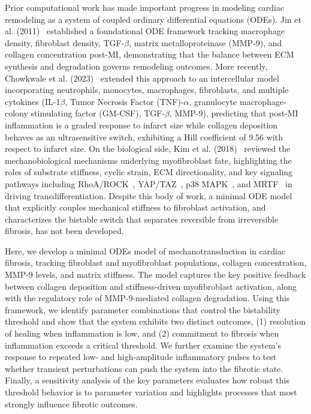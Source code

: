 \documentclass[Afour,sageh,times]{sagej}
\begin{document}
Prior computational work has made important progress in modeling cardiac remodeling as a system of coupled ordinary differential equations (ODEs). Jin et al. (2011)~\citep{jin2011combining} established a foundational ODE framework tracking macrophage density, fibroblast density, TGF-$\beta$, matrix metalloproteinase (MMP-9), and collagen concentration post-MI, demonstrating that the balance between ECM synthesis and degradation governs remodeling outcomes. More recently, Chowkwale et al. (2023)~\citep{chowkwale2023} extended this approach to an intercellular model incorporating neutrophils, monocytes, macrophages, fibroblasts, and multiple cytokines (IL-1$\beta$, Tumor Necrosis Factor (TNF)-$\alpha$, granulocyte macrophage-colony stimulating factor (GM-CSF), TGF-$\beta$, MMP-9), predicting that post-MI inflammation is a graded response to infarct size while collagen deposition behaves as an ultrasensitive switch, exhibiting a Hill coefficient of 9.56 with respect to infarct size. On the biological side, Kim et al. (2018)~\citep{kim2018} reviewed the mechanobiological mechanisms underlying myofibroblast fate, highlighting the roles of substrate stiffness, cyclic strain, ECM directionality, and key signaling pathways including RhoA/ROCK~\citep{jenkins2006ligation, wipff2007myofibroblast}, YAP/TAZ~\citep{liu2015mechanosignaling, mosqueira2014hippo, yang2014mechanical}, p38 MAPK~\citep{molkentin2017fibroblast, wang2000force}, and MRTF~\citep{huang2012matrix} in driving transdifferentiation. Despite this body of work, a minimal ODE model that explicitly couples mechanical stiffness to fibroblast activation, and characterizes the bistable switch that separates reversible from irreversible fibrosis, has not been developed.

Here, we develop a minimal ODEs model of mechanotransduction in cardiac fibrosis, tracking fibroblast and myofibroblast populations, collagen concentration, MMP-9 levels, and matrix stiffness. The model captures the key positive feedback between collagen deposition and stiffness-driven myofibroblast activation, along with the regulatory role of MMP-9-mediated collagen degradation. Using this framework, we identify parameter combinations that control the bistability threshold and show that the system exhibits two distinct outcomes, (1) resolution of healing when inflammation is low, and (2) commitment to fibrosis when inflammation exceeds a critical threshold. We further examine the system’s response to repeated low- and high-amplitude inflammatory pulses to test whether transient perturbations can push the system into the fibrotic state. Finally, a sensitivity analysis of the key parameters evaluates how robust this threshold behavior is to parameter variation and highlights processes that most strongly influence fibrotic outcomes.
\end{document}
